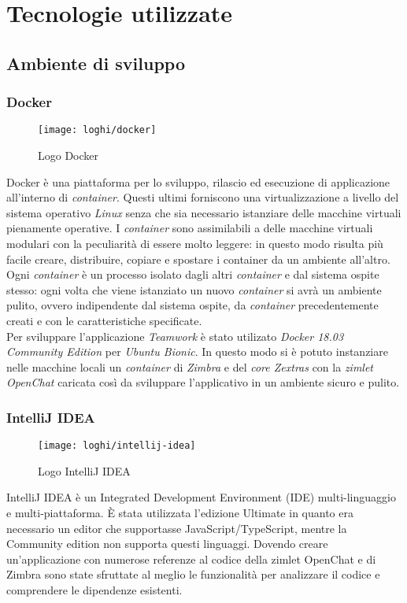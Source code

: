 
\chapter{Tecnologie utilizzate}\label{chap:tec}
\section{Ambiente di sviluppo}
\subsection{Docker}
	\begin{figure}[H] 
		\centering
		\texttt{[image: loghi/docker]}
		\caption{Logo Docker}
	\end{figure}
Docker è una piattaforma per lo sviluppo, rilascio ed esecuzione di applicazione 
all'interno di \emph{container}. Questi ultimi forniscono una virtualizzazione a livello 
del sistema operativo \emph{Linux} senza che sia necessario istanziare delle macchine 
virtuali pienamente operative.
I \emph{container} sono assimilabili a delle macchine virtuali modulari con la peculiarità 
di essere molto leggere: in questo modo risulta più facile creare, distribuire, 
copiare e spostare i container da un ambiente all'altro.
Ogni \emph{container} è un processo isolato dagli altri \emph{container} e dal sistema ospite stesso: ogni volta che viene istanziato un nuovo \emph{container} si avrà un ambiente pulito, ovvero indipendente dal sistema ospite, da \emph{container} precedentemente creati e con le caratteristiche specificate. \\
Per sviluppare l'applicazione \emph{Teamwork} è stato utilizato \emph{Docker 18.03 Community Edition} per \emph{Ubuntu Bionic}. In questo modo si è potuto instanziare nelle macchine locali un \emph{container} di \emph{Zimbra} e del \emph{core Zextras} con la \emph{zimlet OpenChat} caricata così da sviluppare l'applicativo in un ambiente sicuro e pulito.

\subsection{IntelliJ IDEA} \label{subsec:IntelliJ}
	\begin{figure}[H] 
		\centering
		\texttt{[image: loghi/intellij-idea]}
		\caption{Logo IntelliJ IDEA}
	\end{figure}
IntelliJ IDEA è un Integrated Development Environment (IDE) multi-linguaggio e 
multi-piattaforma. 
È stata utilizzata l'edizione Ultimate in quanto era necessario un editor che 
supportasse JavaScript/TypeScript, mentre la Community edition non supporta 
questi linguaggi. 
Dovendo creare un'applicazione con numerose referenze al codice della zimlet 
OpenChat e di Zimbra sono state sfruttate al meglio le funzionalità per 
analizzare il codice e comprendere le dipendenze esistenti.

